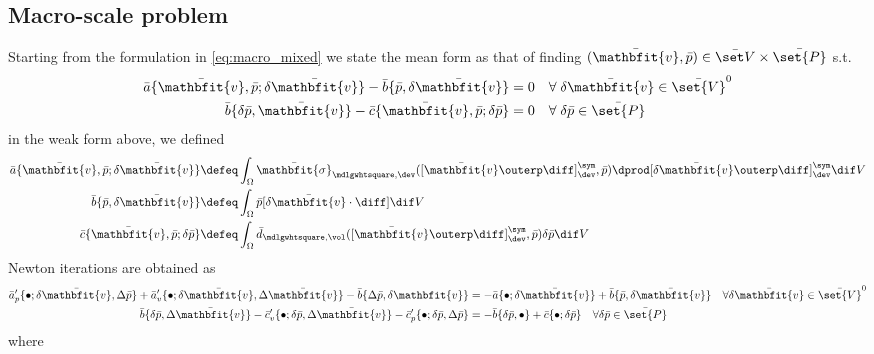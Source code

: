 \documentclass[a4paper,11pt]{article}
\renewcommand{\ta}[1]{\mathbfit{#1}}
\renewcommand{\ts}[1]{\mathbfit{#1}}
\renewcommand{\Box}{\mdlgwhtsquare}
\begin{document}
\subsection{Macro-scale problem}
Starting from the formulation in \eqref{eq:macro_mixed} we state the mean form as that of finding $(\bar{\ta v},\bar p) \in \bar{\set V} \times \bar{\set{P}}$ s.t. 
\begin{align}
 \bar a\{\bar{\ta v},\bar p; \delta\bar{\ta v}\} - \bar b\{\bar p, \delta\bar{\ta v}\} &= 0   \quad \forall\; \delta\bar{\ta v} \in \bar{\set{V}}^0\\
 \bar b\{\delta\bar p, \bar{\ta v}\} - \bar c\{\bar{\ta v}, \bar p; \delta\bar p\}&= 0   \quad \forall\; \delta\bar p \in \bar{\set{P}}
\end{align}
in the weak form above, we defined
\begin{align}
 \bar a\{\bar{\ta v},\bar p; \delta\bar{\ta v}\} &\defeq \int_\Omega \bar{\ts\sigma}_{\Box,\dev}([\bar{\ta v}\outerp \diff]^\sym_\dev,\bar p)\dprod [\delta\bar{\ta v}\outerp \diff]^\sym_\dev \dif V \\
 \bar b\{\bar p, \delta\bar{\ta v}\}             &\defeq \int_\Omega \bar p[\delta\bar{\ta v}\cdot\diff]\dif V \\
 \bar c\{\bar{\ta v}, \bar p; \delta\bar p\}     &\defeq \int_\Omega \bar d_{\Box,\vol}([\bar{\ta v}\outerp \diff]^\sym_\dev,\bar p)\delta\bar p\dif V
\end{align}
Newton iterations are obtained as
\begin{align}
 \bar{a}'_p\{\bullet; \delta\bar{\ta v},\Delta\bar{p}\} + \bar{a}'_v\{\bullet; \delta\bar{\ta v},\Delta\bar{\ta v}\} - \bar{b}\{\Delta\bar p, \delta{\ta v}\}
	  &= -\bar{a}\{\bullet; \delta\bar{\ta v}\} + \bar{b}\{\bar{p}, \delta\bar{\ta v}\}\quad \forall \delta\bar{\ta v} \in \bar{\set{V}}^0\\
\bar{b}\{\delta\bar p, \Delta\bar{\ta v}\} - \bar{c}'_v\{\bullet; \delta\bar{p}, \Delta\bar{ \ta v}\} - \bar{c}'_p\{\bullet; \delta\bar{p},\Delta\bar{p}\}
	  &= -\bar{b}\{\delta\bar{p},\bullet\} + \bar{c}\{\bullet;\delta\bar{p}\}\quad \forall \delta\bar{p} \in \bar{\set{P}}
\end{align}
where
\end{document}
